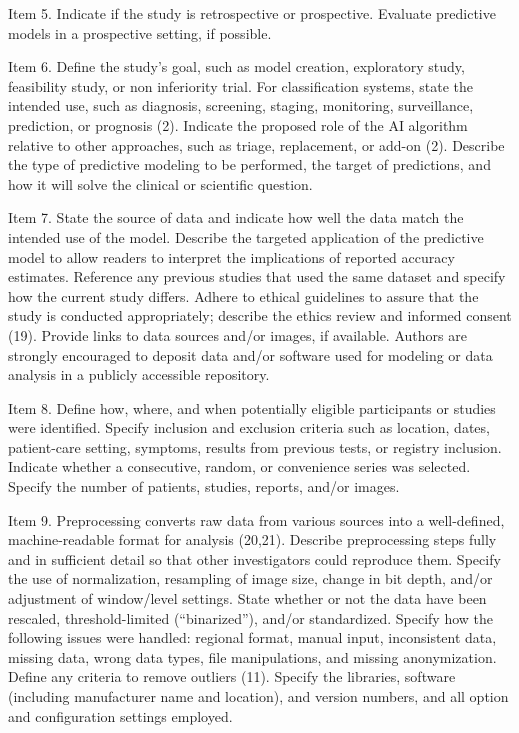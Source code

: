 Item 5. Indicate if the study is retrospective or prospective. Evaluate predictive models in a prospective setting, if possible.

Item 6. Define the study’s goal, such as model creation, exploratory study, feasibility study, or non inferiority trial. For classification systems, state the intended use, such as diagnosis, screening, staging, monitoring, surveillance, prediction, or prognosis (2). Indicate the proposed role of the AI algorithm relative to other approaches, such as triage, replacement, or add-on (2). Describe the type of predictive modeling to be performed, the target of predictions, and how it will solve the clinical or scientific question.

Item 7. State the source of data and indicate how well the data match the intended use of the model. Describe the targeted application of the predictive model to allow readers to interpret the implications of reported accuracy estimates. Reference any previous studies that used the same dataset and specify how the current study differs. Adhere to ethical guidelines to assure that the study is conducted appropriately; describe the ethics review and informed consent (19). Provide links to data sources and/or images, if available. Authors are strongly encouraged to deposit data and/or software used for modeling or data analysis in a publicly accessible repository.

Item 8. Define how, where, and when potentially eligible participants or studies were identified. Specify inclusion and exclusion criteria such as location, dates, patient-care setting, symptoms, results from previous tests, or registry inclusion. Indicate whether a consecutive, random, or convenience series was selected. Specify the number of patients, studies, reports, and/or images.

Item 9. Preprocessing converts raw data from various sources into a well-defined, machine-readable format for analysis (20,21). Describe preprocessing steps fully and in sufficient detail so that other investigators could reproduce them. Specify the use of normalization, resampling of image size, change in bit depth, and/or adjustment of window/level settings. State whether or not the data have been rescaled, threshold-limited (“binarized”), and/or standardized. Specify how the following issues were handled: regional format, manual input, inconsistent data, missing data, wrong data types, file manipulations, and missing anonymization. Define any criteria to remove outliers (11). Specify the libraries, software (including manufacturer name and location), and version numbers, and all option and configuration settings employed.

